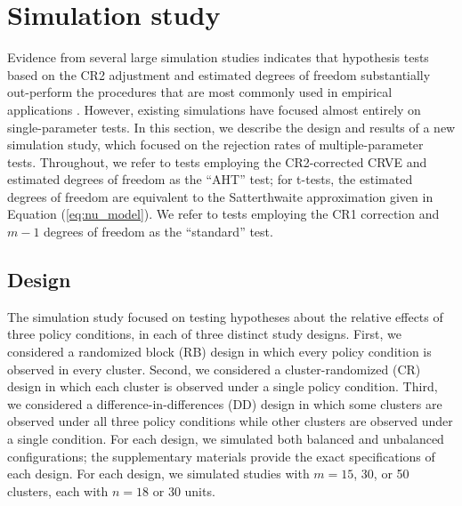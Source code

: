 \documentclass[12pt]{article}\usepackage[]{graphicx}\usepackage[]{color}
\begin{document}
\section{Simulation study}
\label{sec:simulation}

Evidence from several large simulation studies indicates that hypothesis tests based on the CR2 adjustment and estimated degrees of freedom substantially out-perform the procedures that are most commonly used in empirical applications \citep[][]{Cameron2015practitioners, Imbens2015robust,Bell2002bias}.
However, existing simulations have focused almost entirely on single-parameter tests. 
In this section, we describe the design and results of a new simulation study, which focused on the rejection rates of multiple-parameter tests.
Throughout, we refer to tests employing the CR2-corrected CRVE and estimated degrees of freedom as the ``AHT'' test; for t-tests, the estimated degrees of freedom are equivalent to the Satterthwaite approximation given in Equation (\ref{eq:nu_model}). 
We refer to tests employing the CR1 correction and $m - 1$ degrees of freedom as the ``standard'' test. 

\subsection{Design}

The simulation study focused on testing hypotheses about the relative effects of three policy conditions, in each of three distinct study designs. 
First, we considered a randomized block (RB) design in which every policy condition is observed in every cluster. 
Second, we considered a cluster-randomized (CR) design in which each cluster is observed under a single policy condition. 
Third, we considered a difference-in-differences (DD) design in which some clusters are observed under all three policy conditions while other clusters are observed under a single condition. 
For each design, we simulated both balanced and unbalanced configurations; 
the supplementary materials provide the exact specifications of each design. For each design, we simulated studies with $m = 15$, 30, or 50 clusters, each with $n = 18$ or 30 units.
\end{document}

